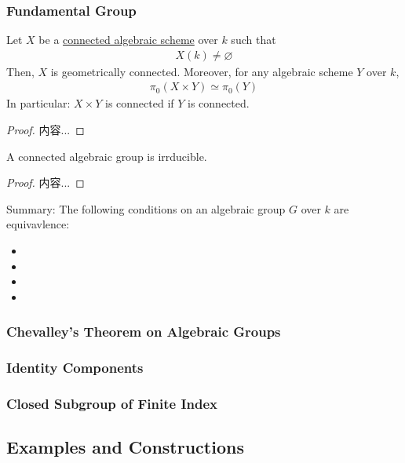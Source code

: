 \documentclass[Total.tex]{subfiles}
\begin{document}
\begin{example}
\begin{gather*rbracketlength=[0.15]}
			\subsubsection{Fundamental Group}
			\begin{lemma}
				Let $X$ be a \underline{connected algebraic scheme} over $k$ such that
				\begin{gather*}
					X(k)\not=\varnothing
				\end{gather*}
				Then, $X$ is geometrically connected. Moreover, for any algebraic scheme $Y$ over $k$,
				\begin{gather*}
					\pi_0(X\times Y)\simeq \pi_0(Y)
				\end{gather*}
				In particular: $X\times Y$ is connected if $Y$ is connected.
			\end{lemma}
			\begin{proof}
				内容...
			\end{proof}
			\begin{corollary}
				A connected algebraic group is irrducible.
			\end{corollary}
			\begin{proof}
				内容...
			\end{proof}
			
			\begin{proposition}
				Summary: The following conditions on an algebraic group $G$ over $k$ are equivavlence:
				\begin{itemize}
					\item 
					\item 
					\item 
					\item 
				\end{itemize}
			\end{proposition}
			\subsubsection{Chevalley's Theorem on Algebraic Groups}
			\subsubsection{Identity Components}
			\subsubsection{Closed Subgroup of Finite Index}
		\subsection{Examples and Constructions}

\end{gather*rbracketlength=[0.15]}
\end{example}
\end{document}

